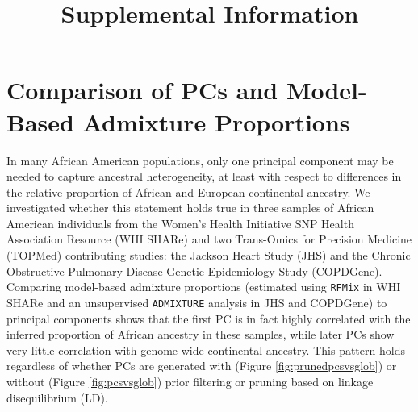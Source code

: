 \documentclass[12pt]{article}
\title{Supplemental Information}
\begin{document}
\maketitle
\tableofcontents %

\newpage
\listoffigures

\newpage


\newpage
\section{Comparison of PCs and Model-Based Admixture Proportions}
\label{sec:pcsvspi}

In many African American populations, only one principal component may be needed to capture ancestral heterogeneity, at least with respect to differences in the relative proportion of African and European continental ancestry.
We investigated whether this statement holds true in three samples of African American individuals from the Women's Health Initiative SNP Health Association Resource (WHI SHARe) and two Trans-Omics for Precision Medicine (TOPMed) contributing studies: the Jackson Heart Study (JHS) and the Chronic Obstructive Pulmonary Disease Genetic Epidemiology Study (COPDGene).
Comparing model-based admixture proportions (estimated using \texttt{RFMix} \citep{rfmix} in WHI SHARe and an unsupervised \texttt{ADMIXTURE} \citep{admixture} analysis in JHS and COPDGene) to principal components shows that the first PC is in fact highly correlated with the inferred proportion of African ancestry in these samples, while later PCs show very little correlation with genome-wide continental ancestry.
This pattern holds regardless of whether PCs are generated with (Figure \ref{fig:prunedpcsvsglob}) or without (Figure \ref{fig:pcsvsglob}) prior filtering or pruning based on linkage disequilibrium (LD).
\end{document}
